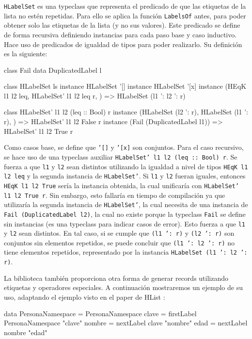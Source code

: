 \texttt{HLabelSet} es una typeclass que representa el predicado de que las etiquetas de la lista no estén repetidas. Para ello se aplica la función \texttt{LabelsOf} antes, para poder obtener solo las etiquetas de la lista (y no sus valores). Este predicado se define de forma recursiva definiendo instancias para cada paso base y caso inductivo. Hace uso de predicados de igualdad de tipos para poder realizarlo. Su definición es la siguiente:

\begin{code}
class Fail
data DuplicatedLabel l

class HLabelSet ls
instance HLabelSet '[]
instance HLabelSet '[x]
instance (HEqK l1 l2 leq, 
  HLabelSet' l1 l2 leq r,
  ) => HLabelSet (l1 ': l2 ': r)

class HLabelSet' l1 l2 (leq :: Bool) r
instance (HLabelSet (l2 ': r),
  HLabelSet (l1 ': r),
  ) => HLabelSet' l1 l2 False r
instance (Fail (DuplicatedLabel l1)) =>
  HLabelSet' l1 l2 True r
\end{code}

Como casos base, se define que \texttt{'[]} y \texttt{'[x]} son conjuntos. Para el caso recursivo, se hace uso de una typeclass auxiliar \texttt{HLabelSet' l1 l2 (leq :: Bool) r}. Se fuerza a que \texttt{l1} y \texttt{l2} sean distintos utilizando la igualdad a nivel de tipos \texttt{HEqK l1 l2 leq} y la segunda instancia de \texttt{HLabelSet'}. Si \texttt{l1} y \texttt{l2} fueran iguales, entonces \texttt{HEqK l1 l2 True} sería la instancia obtenida, la cual unificaría con \texttt{HLabelSet' l1 l2 True r}. Sin embargo, esto fallaría en tiempo de compilación ya que utilizaría la segunda instancia de \texttt{HLabelSet'}, la cual necesita de una instancia de \texttt{Fail (DuplicatedLabel l2)}, la cual no existe porque la typeclass \texttt{Fail} se define sin instancias (es una typeclass para indicar casos de error). Esto fuerza a que \texttt{l1} y \texttt{l2} sean distintos. En tal caso, si se cumple que \texttt{(l1 ': r)} y \texttt{(l2 ': r)} son conjuntos sin elementos repetidos, se puede concluir que \texttt{(l1 ': l2 ': r)} no tiene elementos repetidos, representado por la instancia \texttt{HLabelSet (l1 ': l2 ': r)}.

La biblioteca también proporciona otra forma de generar records utilizando etiquetas y operadores especiales. A continuación mostraremos un ejemplo de su uso, adaptando el ejemplo visto en el paper de HList \cite{Kiselyov:2004:STH:1017472.1017488}:

\begin{code}
data PersonaNamespace = PersonaNamespace
clave = firstLabel PersonaNamespace "clave"
nombre = nextLabel clave "nombre"
edad = nextLabel nombre "edad"
\end{code}

